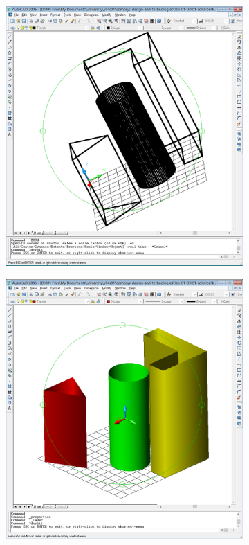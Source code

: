 \documentclass[
	a4paper,
	oneside,
	BCOR = 10mm,
	DIV = 12,
	12pt,
	headings = normal,
]{scrartcl}
\newlength{\gridunitwidth}
\begin{document}
			\begin{figure}[!htbp]
				\begin{subfigure}[b]{6 \gridunitwidth - (1em / 2)}
					\includegraphics[width = \columnwidth]{./assets/p15.png}
					\caption{}
					\label{subfig:05-viewport-single-01}
				\end{subfigure}%
				\hspace{1em}%
				\begin{subfigure}[b]{6 \gridunitwidth - (1em / 2)}
					\centering
					\includegraphics[width = \columnwidth]{./assets/p16.png}

\end{subfigure}
\end{figure}
\end{document}
